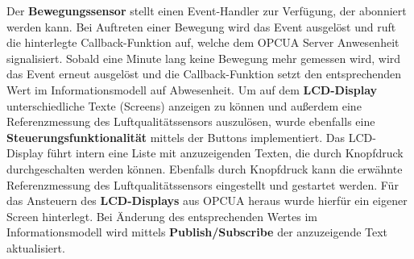 Der \textbf{Bewegungssensor} stellt einen Event-Handler zur Verfügung, der abonniert werden kann. Bei Auftreten einer Bewegung wird das Event ausgelöst und ruft die hinterlegte Callback-Funktion auf, welche dem OPCUA Server Anwesenheit signalisiert. Sobald eine Minute lang keine Bewegung mehr gemessen wird, wird das Event erneut ausgelöst und die Callback-Funktion setzt den entsprechenden Wert im Informationsmodell auf Abwesenheit.
\newline Um auf dem \textbf{LCD-Display} unterschiedliche Texte (Screens) anzeigen zu können und außerdem eine Referenzmessung des Luftqualitätssensors auszulösen, wurde ebenfalls eine \textbf{Steuerungsfunktionalität} mittels der Buttons implementiert. Das LCD-Display führt intern eine Liste mit anzuzeigenden Texten, die durch Knopfdruck durchgeschalten werden können. Ebenfalls durch Knopfdruck kann die erwähnte Referenzmessung des Luftqualitätssensors eingestellt und gestartet werden.
Für das Ansteuern des \textbf{LCD-Displays} aus OPCUA heraus wurde hierfür ein eigener Screen hinterlegt. Bei Änderung des entsprechenden Wertes im Informationsmodell wird mittels \textbf{Publish/Subscribe} der anzuzeigende Text aktualisiert.
